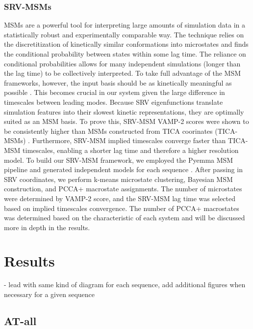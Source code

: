 \documentclass[journal=jpcbfk,manuscript=article]{achemso}
\begin{document}
\subsubsection{\label{sec:methods}SRV-MSMs}

MSMs are a powerful tool for interpreting large amounts of simulation data in a statistically robust and experimentally comparable way. The technique relies on the discretitization of kinetically similar conformations into microstates and finds the conditional probability between states within some lag time. The reliance on conditional probabilities allows for many independent simulations (longer than the lag time) to be collectively interpreted. To take full advantage of the MSM frameworks, however, the input basis should be as kinetically meaningful as possible \citep{Pande2010EverythingAsk}. This becomes crucial in our system given the large difference in timescales between leading modes. Because SRV eigenfunctions translate simulation features into their slowest kinetic representations, they are optimally suited as an MSM basis. To prove this, SRV-MSM VAMP-2 scores were shown to be consistently higher than MSMs constructed from TICA coorinates (TICA-MSMs) \citep{Sidky}. Furthermore, SRV-MSM implied timescales converge faster than TICA-MSM timescales, enabling a shorter lag time and therefore a higher resolution model. To build our SRV-MSM framework, we employed the Pyemma MSM pipeline and generated independent models for each sequence \citep{Scherer2015PyEMMAModels}. After passing in SRV coordinates, we perform k-means microstate clustering, Bayesian MSM construction, and PCCA+ macrostate assignments. The number of microstates were determined by VAMP-2 score, and the SRV-MSM lag time was selected based on implied timescales convergence.  The number of PCCA+ macrostates was determined based on the characteristic of each system and will be discussed more in depth in the results. 



\section{\label{sec:Results}Results}
- lead with same kind of diagram for each sequence, add additional figures when necessary for a given sequence

\subsection{\label{sec:Results}AT-all}
\end{document}
